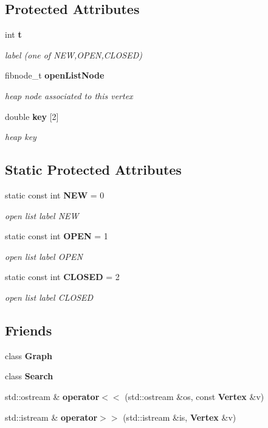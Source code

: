\subsection*{\-Protected \-Attributes}
\begin{DoxyCompactItemize}
\item 
int {\bf t}
\begin{DoxyCompactList}\small\item\em label (one of \-N\-E\-W,\-O\-P\-E\-N,\-C\-L\-O\-S\-E\-D) \end{DoxyCompactList}\item 
fibnode\-\_\-t {\bf open\-List\-Node}
\begin{DoxyCompactList}\small\item\em heap node associated to this vertex \end{DoxyCompactList}\item 
double {\bf key} [2]
\begin{DoxyCompactList}\small\item\em heap key \end{DoxyCompactList}\end{DoxyCompactItemize}
\subsection*{\-Static \-Protected \-Attributes}
\begin{DoxyCompactItemize}
\item 
static const int {\bf \-N\-E\-W} = 0
\begin{DoxyCompactList}\small\item\em open list label \-N\-E\-W \end{DoxyCompactList}\item 
static const int {\bf \-O\-P\-E\-N} = 1
\begin{DoxyCompactList}\small\item\em open list label \-O\-P\-E\-N \end{DoxyCompactList}\item 
static const int {\bf \-C\-L\-O\-S\-E\-D} = 2
\begin{DoxyCompactList}\small\item\em open list label \-C\-L\-O\-S\-E\-D \end{DoxyCompactList}\end{DoxyCompactItemize}
\subsection*{\-Friends}
\begin{DoxyCompactItemize}
\item 
class {\bf \-Graph}
\item 
class {\bf \-Search}
\item 
std\-::ostream \& {\bf operator$<$$<$} (std\-::ostream \&os, const {\bf \-Vertex} \&v)
\item 
std\-::istream \& {\bf operator$>$$>$} (std\-::istream \&is, {\bf \-Vertex} \&v)
\end{DoxyCompactItemize}



